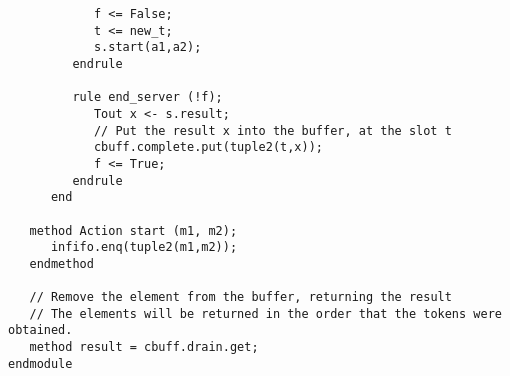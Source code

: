 \begin{verbatim}
            f <= False;
            t <= new_t;
            s.start(a1,a2);
         endrule

         rule end_server (!f);
            Tout x <- s.result;
            // Put the result x into the buffer, at the slot t
            cbuff.complete.put(tuple2(t,x));
            f <= True;
         endrule
      end

   method Action start (m1, m2);
      infifo.enq(tuple2(m1,m2));      
   endmethod
   
   // Remove the element from the buffer, returning the result
   // The elements will be returned in the order that the tokens were obtained.
   method result = cbuff.drain.get;
endmodule
\end{verbatim}
